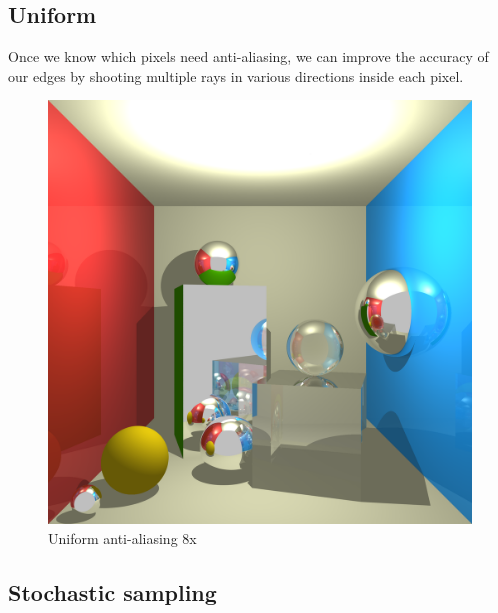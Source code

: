 \subsection{Uniform}
Once we know which pixels need anti-aliasing, we can improve the accuracy of our edges by shooting multiple rays in various directions inside each pixel.

\begin{figure}[H]
\centering
\includegraphics[width=0.35\linewidth]{img/glass_awesome.png}
\caption{Uniform anti-aliasing 8x}
\end{figure}

\subsection{Stochastic sampling}

